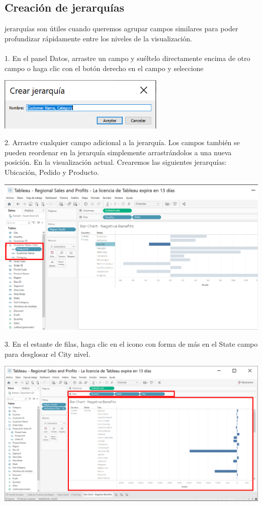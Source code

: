\documentclass[12pt,letterpaper]{article}
\begin{document}
\subsection{Creación de jerarquías}
jerarquías son útiles cuando queremos agrupar campos similares para poder profundizar
rápidamente entre los niveles de la visualización.
\\\\1. En el panel Datos, arrastre un campo y suéltelo directamente encima de otro campo o haga clic
con el botón derecho en el campo y seleccione
\begin{center}
    \includegraphics[width=8cm]{img/30.png}  
\end{center}
2. Arrastre cualquier campo adicional a la jerarquía. Los campos también se pueden reordenar en
la jerarquía simplemente arrastrándolos a una nueva posición. En la visualización
actual. Crearemos las siguientes jerarquías: Ubicación, Pedido y Producto.
\begin{center}
    \includegraphics[width=16cm]{img/31.png}  
\end{center}
3. En el estante de filas, haga clic en el icono con forma de más en el State campo para desglosar
el City nivel.
\begin{center}
    \includegraphics[width=16cm]{img/32.png}  
\end{center}
\end{document}
